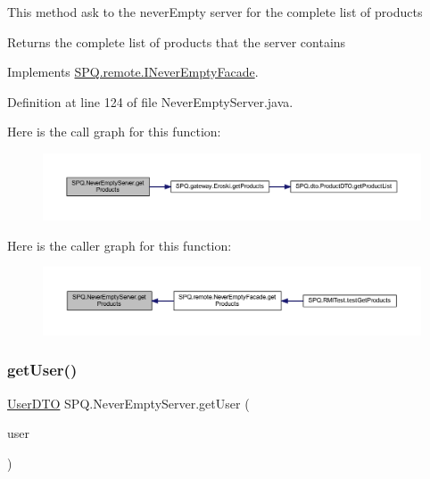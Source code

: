 This method ask to the never\+Empty server for the complete list of products \begin{DoxyReturn}{Returns}
the complete list of products that the server contains 
\end{DoxyReturn}


Implements \mbox{\hyperlink{interface_s_p_q_1_1remote_1_1_i_never_empty_facade_a62d4a1747b8ba90f451fc9f9343055f3}{S\+P\+Q.\+remote.\+I\+Never\+Empty\+Facade}}.



Definition at line 124 of file Never\+Empty\+Server.\+java.

Here is the call graph for this function\+:\nopagebreak
\begin{figure}[H]
\begin{center}
\leavevmode
\includegraphics[width=350pt]{class_s_p_q_1_1_never_empty_server_ad8c5a0afa259c6b8bcc2eb2444742ca2_cgraph}
\end{center}
\end{figure}
Here is the caller graph for this function\+:\nopagebreak
\begin{figure}[H]
\begin{center}
\leavevmode
\includegraphics[width=350pt]{class_s_p_q_1_1_never_empty_server_ad8c5a0afa259c6b8bcc2eb2444742ca2_icgraph}
\end{center}
\end{figure}
\mbox{\label{class_s_p_q_1_1_never_empty_server_abb18bd0d72ecb8790068f206c592c58d}} 
\subsubsection{\texorpdfstring{get\+User()}{getUser()}}
{\footnotesize\ttfamily \mbox{\hyperlink{class_s_p_q_1_1dto_1_1_user_d_t_o}{User\+D\+TO}} S\+P\+Q.\+Never\+Empty\+Server.\+get\+User (\begin{DoxyParamCaption}\item[{\mbox{\hyperlink{class_s_p_q_1_1dto_1_1_user_d_t_o}{User\+D\+TO}}}]{user }\end{DoxyParamCaption})}



